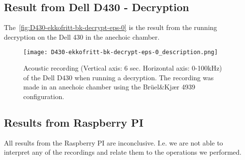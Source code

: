 \subsection{Result from Dell D430 - Decryption}\label{chp5:subsec:d430_bk_results_cpuload}

The~\autoref{fig:D430-ekkofritt-bk-decrypt-eps-0} is the result from the running decryption on the Dell 430 in the anechoic chamber. 
\begin{figure}[ht]
    \centering
    \texttt{[image: D430-ekkofritt-bk-decrypt-eps-0\_description.png]}
    \caption{Acoustic recording (Vertical axis: 6 sec. Horizontal axis: 0-100kHz) of the Dell D430 when running a decryption. The recording was made in an anechoic chamber using the Brüel\&Kjær 4939 configuration.}
    \label{fig:D430-ekkofritt-bk-decrypt-eps-0}
\end{figure}

\subsection{Results from Raspberry PI}\label{chp5:subsec:rb_bk_results}
All results from the Raspberry PI are inconclusive. 
I.e. we are not able to interpret any of the recordings and relate them to the operations we performed.
